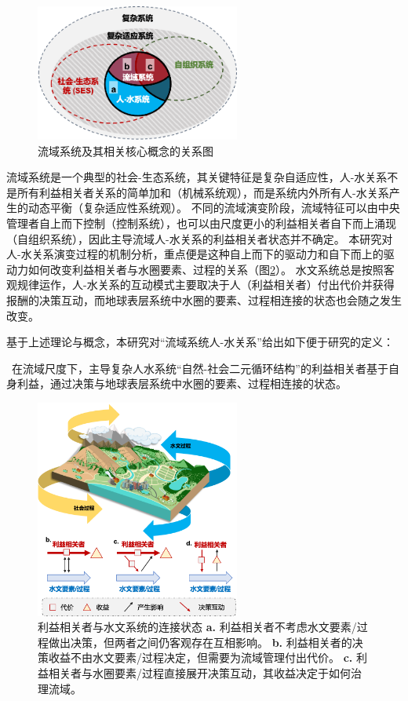 \begin{figure}[!ht] %
    \centering
    \includegraphics[width=0.6\textwidth]{img/ch2/ch2_concepts.png}
    \caption{流域系统及其相关核心概念的关系图}\label{ch2:fig:concepts}
\end{figure}

流域系统是一个典型的社会-生态系统，其关键特征是复杂自适应性，人-水关系不是所有利益相关者关系的简单加和（机械系统观），而是系统内外所有人-水关系产生的动态平衡（复杂适应性系统观）。
不同的流域演变阶段，流域特征可以由中央管理者自上而下控制（控制系统），也可以由尺度更小的利益相关者自下而上涌现（自组织系统），因此主导流域人-水关系的利益相关者状态并不确定。
本研究对人-水关系演变过程的机制分析，重点便是这种自上而下的驱动力和自下而上的驱动力如何改变利益相关者与水圈要素、过程的关系（图\ref{ch2:fig:interactions}）。
水文系统总是按照客观规律运作，人-水关系的互动模式主要取决于人（利益相关者）付出代价并获得报酬的决策互动，而地球表层系统中水圈的要素、过程相连接的状态也会随之发生改变。

基于上述理论与概念，本研究对“流域系统人-水关系”给出如下便于研究的定义：

{\kai~在流域尺度下，主导复杂人水系统“自然-社会二元循环结构”的利益相关者基于自身利益，通过决策与地球表层系统中水圈的要素、过程相连接的状态。}

\begin{figure}[!ht]
    \centering
    \includegraphics[width=0.6\textwidth]{img/ch2/ch2_interactions.png}
    \caption[利益相关者与水文系统的连接状态]{利益相关者与水文系统的连接状态
        \textbf{a.} 利益相关者不考虑水文要素/过程做出决策，但两者之间仍客观存在互相影响。
        \textbf{b.} 利益相关者的决策收益不由水文要素/过程决定，但需要为流域管理付出代价。
        \textbf{c.} 利益相关者与水圈要素/过程直接展开决策互动，其收益决定于如何治理流域。
    }\label{ch2:fig:interactions}
\end{figure}
